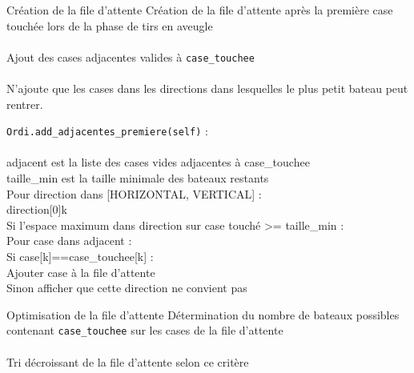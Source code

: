 \begin{frame}{Création de la file d'attente}
Création de la file d'attente après la première case touchée lors de la phase de tirs en aveugle\\~\\  \pause
Ajout des cases adjacentes valides à \texttt{case\_touchee}\\~\\  \pause
N'ajoute que les cases dans les directions dans lesquelles le plus petit bateau peut rentrer.
\end{frame}

{
\begin{frame}
\texttt{Ordi.add\_adjacentes\_premiere(self)} :\\~\\
adjacent est la liste des cases vides adjacentes à case\_touchee\\
taille\_min est la taille minimale des bateaux restants\\
Pour direction dans [HORIZONTAL, VERTICAL] :\\
direction[0]\sto k\\
Si l'espace maximum dans direction sur case touché >= taille\_min :\\
Pour case dans adjacent :\\
Si case[k]==case\_touchee[k] :\\
Ajouter case à la file d'attente\\
Sinon afficher que cette direction ne convient pas\\
\end{frame}
}



\begin{frame}{Optimisation de la file d'attente}
Détermination du nombre de bateaux possibles contenant \texttt{case\_touchee} sur les cases de la file d'attente\\~\\
Tri décroissant de la file d'attente selon ce critère
\end{frame}

